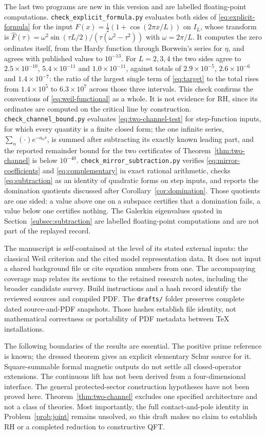 The last two programs are new in this version and are labelled
floating-point computations. \texttt{check\_explicit\_formula.py} evaluates
both sides of \eqref{eq:explicit-formula} for the input
$F(x)=\tfrac12(1+\cos(2\pi x/L))$ on $I_L$, whose transform is
$\widehat F(\tau)=\omega^2\sin(\tau L/2)/(\tau(\omega^2-\tau^2))$ with
$\omega=2\pi/L$. It computes the zero ordinates itself, from the Hardy
function through Borwein's series for $\eta$, and agrees with published
values to $10^{-13}$. For $L=2,3,4$ the two sides agree to
$2.5\times10^{-10}$, $5.4\times10^{-11}$ and $1.0\times10^{-11}$, against
totals of $2.9\times10^{-5}$, $2.6\times10^{-6}$ and $1.4\times10^{-7}$:
the ratio of the largest single term of \eqref{eq:target} to the total rises
from $1.4\times10^5$ to $6.3\times10^7$ across those three intervals. This
check confirms the conventions of \eqref{eq:weil-functional} as a whole. It
is not evidence for RH, since its ordinates are computed on the critical
line by construction.
\texttt{check\_channel\_bound.py} evaluates \eqref{eq:two-channel-test} for
step-function inputs, for which every quantity is a finite closed form; the
one infinite series, $\sum_n(\cdot)e^{-a_nr}$, is summed after subtracting
its exactly known leading part, and the reported remainder bound for the two
certificates of Theorem~\ref{thm:two-channel} is below $10^{-40}$.
\texttt{check\_mirror\_subtraction.py} verifies
\eqref{eq:mirror-coefficients} and \eqref{eq:complementary} in exact rational
arithmetic, checks \eqref{eq:subtraction} as an identity of quadratic forms on
step inputs, and reports the domination quotients discussed after
Corollary~\ref{cor:domination}. Those quotients are one sided: a value above
one on a subspace certifies that a domination fails, a value below one
certifies nothing. The Galerkin eigenvalues quoted in
Section~\ref{subsec:subtraction} are labelled floating-point computations and
are not part of the replayed record.

The manuscript is self-contained at the level of its stated external
inputs: the classical Weil criterion and the cited model representation
data. It does not input a shared background file or cite equation numbers
from one. The accompanying coverage map relates its sections to the
retained research notes, including the broader candidate survey.
Build instructions and a hash record identify the reviewed sources and
compiled PDF. The \texttt{drafts/} folder preserves complete dated
source-and-PDF snapshots. Those hashes establish file identity, not
mathematical correctness or portability of PDF metadata between TeX
installations.

The following boundaries of the results are essential. The positive
prime reference is known; the dressed theorem gives an explicit
elementary Schur source for it. Square-summable formal magnetic
outputs do not settle all closed-operator extensions. The continuous
lift has not been derived from a four-dimensional interface. The
general protected-sector construction hypotheses have not been
proved here. Theorem~\ref{thm:two-channel} excludes one specified
architecture and not a class of theories. Most importantly, the full
contact-and-pole identity in Problem~\ref{prob:joint} remains unsolved, so
this draft makes no claim to establish RH or a completed reduction to
constructive QFT.

